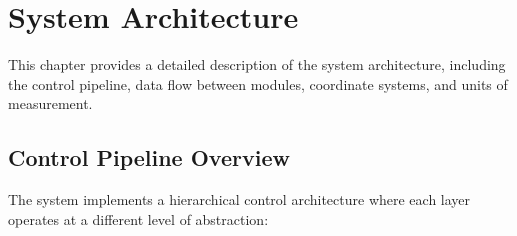 
\chapter{System Architecture}
\label{ch:architecture}

This chapter provides a detailed description of the system architecture, including the control pipeline, data flow between modules, coordinate systems, and units of measurement.

\section{Control Pipeline Overview}

The system implements a hierarchical control architecture where each layer operates at a different level of abstraction:

